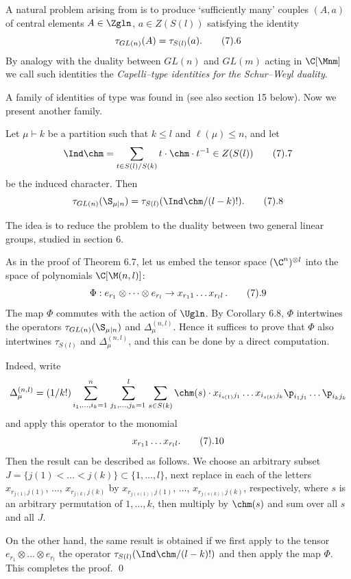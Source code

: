 A natural problem arising from  is to produce `sufficiently many'
couples $(A,a)$ of central elements $A\in\Zgln$, $a\in Z(S(l))$
satisfying the identity 
$$
\tau_{GL(n)}(A)=\tau_{S(l)}(a).\tag7.6
$$
By analogy with the duality between $GL(n)$ and $GL(m)$ acting in
$\C[\Mnm]$ we call such identities the {\it Capelli--type identities for the
Schur--Weyl duality\/}.

A family of identities of type  was found in \cite{KO} (see also
section 15 below). Now we present another family.

 Let $\mu\vdash k$ be a partition such that
$k\le l$ and $\ell(\mu)\le n$, and let
$$
\Ind\chm =\sum_{t\in S(l)/S(k)} t\cdot\chm\cdot t^{-1}\in Z(S(l)) \tag7.7
$$
be the induced character. 
Then
$$
\tau_{GL(n)}(\S_{\mu|n})=\tau_{S(l)}(\Ind\chm/(l-k)!).\tag7.8
$$
\endproclaim

 The idea is to reduce the problem to the duality between
two general linear groups, studied in section 6.

As in the proof of Theorem 6.7, let us embed the tensor space
$(\C^n)^{\otimes l}$ into the space of polynomials 
$\C[\M(n,l)]$: 
$$
\Phi: e_{r_1}\otimes\dots\otimes e_{r_l} \to
x_{r_1 1}\dots x_{r_l l} \,. \tag7.9
$$
The map $\Phi$ commutes with the action of $\Ugln$. By Corollary 6.8,
$\Phi$ intertwines the operators $\tau_{GL(n)}(\S_{\mu|n})$ and
$\Delta_\mu^{(n,l)}$. Hence it suffices to prove that $\Phi$ also
intertwines $\tau_{S(l)}$ and $\Delta_\mu^{(n,l)}$, and this can be 
done by a direct computation.

Indeed, write
$$
\Delta_\mu^{(n,l)}=(1/k!)
\sum_{i_1,\dots,i_k=1\,}^n 
\sum_{j_1,\dots,j_k=1\,}^l
\sum_{s\in S(k)} \chm(s)\cdot
x_{i_{s(1)} j_1} \dots x_{i_{s(k)} j_k}
\p_{i_1 j_1} \dots \p_{i_k j_k}
$$
and apply this operator to the monomial
$$
x_{r_1 1}\ldots x_{r_l l}. \tag7.10
$$
Then the result can be described as follows. We choose an arbitrary subset
$J=\{j(1)<\ldots<j(k)\}\subset\{1,\ldots,l\}$, next replace 
in  each
of the letters $x_{r_{j(1)}j(1)}$, $\ldots$, $x_{r_{j(k)}j(k)}$ by 
$x_{r_{j(s(1))}j(1)}$, $\ldots$, $x_{r_{j(s(k))}j(k)}$, respectively, 
where $s$ is an arbitrary 
permutation of $1,\ldots,k$, then multiply by $\chm(s)$ and sum over all $s$
and all $J$.

On the other hand, the same result is obtained if we first apply to the
tensor $e_{r_1}\otimes\dots\otimes e_{r_l}$ the operator
$\tau_{S(l)}(\Ind\chm/(l-k)!)$ and then apply the map $\Phi$. This
completes the proof. \qed
\enddemo


